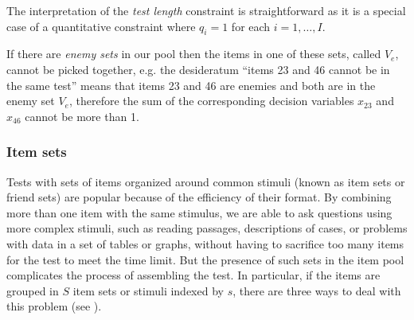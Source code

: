 The interpretation of the \textit{test length} constraint is straightforward as it is a special case of a quantitative constraint where $q_i=1$ for each $i=1,\ldots,I$.

If there are \textit{enemy sets} in our pool then the items in one of these sets, called $V_e$, cannot be picked together, e.g. the desideratum ``items 23 and 46 cannot be in the same test'' means that items 23 and 46 are enemies and both are in the enemy set $V_e$, therefore the sum of the corresponding decision variables $x_{23}$ and $x_{46}$ cannot be more than 1.

\subsubsection{Item sets}\label{sec:item-sets}
Tests with sets of items organized around common stimuli (known as item sets or friend sets) are popular because of the efficiency of their format. By combining more than one item with the same stimulus, we are able to ask questions using more complex stimuli, such as reading passages, descriptions of cases, or problems with data in a set of tables or graphs, without having to sacrifice too many items for the test to meet the time limit. But the presence of such sets in the item pool complicates the process of assembling the test. In particular, if the items are grouped in $S$ item sets or stimuli indexed by $s$, there are three ways to deal with this problem (see \cite{VanDerLinden2005}).

